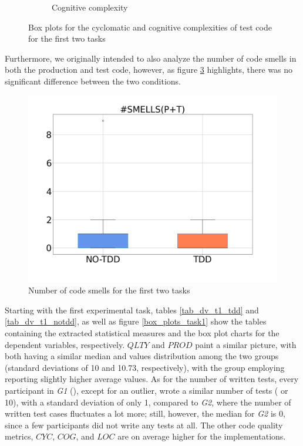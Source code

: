 \begin{figure}[htbp]
\begin{subfigure}{0.5\textwidth}
        \caption{Cognitive complexity}
        \label{bp_task1_2_cog_test}
    \end{subfigure}
    \caption{Box plots for the cyclomatic and cognitive complexities of test code for the first two tasks}
    \label{bp_task1_2_cyc_cog_test}
\end{figure}

Furthermore, we originally intended to also analyze the number of code smells in both the production and test code, however, as figure \ref{bp_task1_2_smells} highlights, there was no significant difference between the two conditions.

\begin{figure}[h]
    \centering
    \includegraphics[width=0.5\linewidth, scale=0.5]{figures/box_plots/SMELLS.png}
    \caption{Number of code smells for the first two tasks}
    \label{bp_task1_2_smells}
\end{figure}


Starting with the first experimental task, tables \ref{tab_dv_t1_tdd} and \ref{tab_dv_t1_notdd}, as well as figure \ref{box_plots_task1} show the tables containing the extracted statistical measures and the box plot charts for the dependent variables, respectively.
$QLTY$ and $PROD$ paint a similar picture, with both having a similar median and values distribution among the two groups (standard deviations of 10 and 10.73, respectively), with the group employing \tdd reporting slightly higher average values.
As for the number of written tests, every participant in \textit{G1} (\tdd), except for an outlier, wrote a similar number of tests ( or 10), with a standard deviation of only 1, compared to \textit{G2}, where the number of written test cases fluctuates a lot more; still, however, the median for \textit{G2} is 0, since a few participants did not write any tests at all.
The other code quality metrics, $CYC$, $COG$, and $LOC$ are on average higher for the \tdd implementations.

